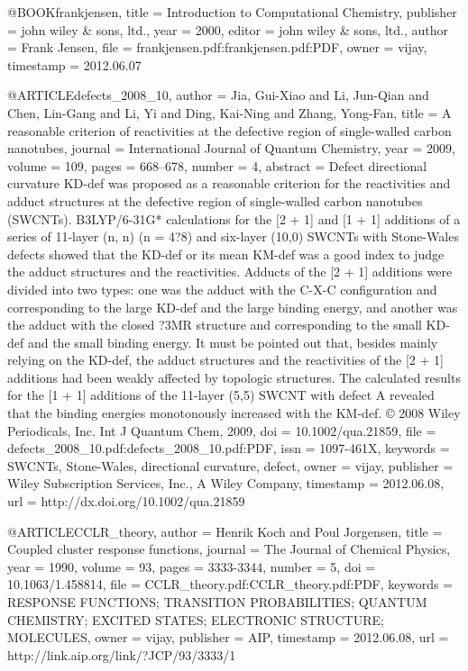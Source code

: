 @BOOK{frankjensen,
  title = {Introduction to Computational Chemistry},
  publisher = {john wiley \& sons, ltd.},
  year = {2000},
  editor = {john wiley \& sons, ltd.},
  author = {Frank Jensen},
  file = {frankjensen.pdf:frankjensen.pdf:PDF},
  owner = {vijay},
  timestamp = {2012.06.07}
}

@ARTICLE{defects_2008_10,
  author = {Jia, Gui-Xiao and Li, Jun-Qian and Chen, Lin-Gang and Li, Yi and
	Ding, Kai-Ning and Zhang, Yong-Fan},
  title = {A reasonable criterion of reactivities at the defective region of
	single-walled carbon nanotubes},
  journal = {International Journal of Quantum Chemistry},
  year = {2009},
  volume = {109},
  pages = {668--678},
  number = {4},
  abstract = {Defect directional curvature KD-def was proposed as a reasonable criterion
	for the reactivities and adduct structures at the defective region
	of single-walled carbon nanotubes (SWCNTs). B3LYP/6-31G* calculations
	for the [2 + 1] and [1 + 1] additions of a series of 11-layer (n,
	n) (n = 4?8) and six-layer (10,0) SWCNTs with Stone-Wales defects
	showed that the KD-def or its mean KM-def was a good index to judge
	the adduct structures and the reactivities. Adducts of the [2 + 1]
	additions were divided into two types: one was the adduct with the
	C-X-C configuration and corresponding to the large KD-def and the
	large binding energy, and another was the adduct with the closed
	?3MR structure and corresponding to the small KD-def and the small
	binding energy. It must be pointed out that, besides mainly relying
	on the KD-def, the adduct structures and the reactivities of the
	[2 + 1] additions had been weakly affected by topologic structures.
	The calculated results for the [1 + 1] additions of the 11-layer
	(5,5) SWCNT with defect A revealed that the binding energies monotonously
	increased with the KM-def. © 2008 Wiley Periodicals, Inc. Int J Quantum
	Chem, 2009},
  doi = {10.1002/qua.21859},
  file = {defects_2008_10.pdf:defects_2008_10.pdf:PDF},
  issn = {1097-461X},
  keywords = {SWCNTs, Stone-Wales, directional curvature, defect},
  owner = {vijay},
  publisher = {Wiley Subscription Services, Inc., A Wiley Company},
  timestamp = {2012.06.08},
  url = {http://dx.doi.org/10.1002/qua.21859}
}

@ARTICLE{CCLR_theory,
  author = {Henrik Koch and Poul Jorgensen},
  title = {Coupled cluster response functions},
  journal = {The Journal of Chemical Physics},
  year = {1990},
  volume = {93},
  pages = {3333-3344},
  number = {5},
  doi = {10.1063/1.458814},
  file = {CCLR_theory.pdf:CCLR_theory.pdf:PDF},
  keywords = {RESPONSE FUNCTIONS; TRANSITION PROBABILITIES; QUANTUM CHEMISTRY; EXCITED
	STATES; ELECTRONIC STRUCTURE; MOLECULES},
  owner = {vijay},
  publisher = {AIP},
  timestamp = {2012.06.08},
  url = {http://link.aip.org/link/?JCP/93/3333/1}
}

